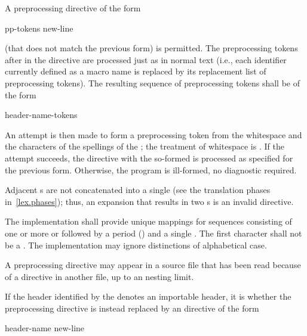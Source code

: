 \pnum
A preprocessing directive of the form
\begin{ncsimplebnf}
 pp-tokens new-line
\end{ncsimplebnf}
(that does not match the previous form) is permitted.
The preprocessing tokens after
in the directive are processed just as in normal text
(i.e., each identifier currently defined as a macro name is replaced by its
replacement list of preprocessing tokens).
The resulting sequence of preprocessing tokens shall be of the form
\begin{ncsimplebnf}
header-name-tokens
\end{ncsimplebnf}
An attempt is then made to form a 
preprocessing token from the whitespace and the characters
of the spellings of the ;
the treatment of whitespace
is .
If the attempt succeeds, the directive with the so-formed 
is processed as specified for the previous form.
Otherwise, the program is
ill-formed, no diagnostic required.
\begin{note}
Adjacent s are not concatenated into
a single 
(see the translation phases in~\ref{lex.phases});
thus, an expansion that results in two s is an
invalid directive.
\end{note}

\pnum
The implementation shall provide unique mappings for
sequences consisting of one or more
 or 
followed by a period
()
and a single
.
The first character shall not be a .
The implementation may ignore distinctions of alphabetical case.

\pnum
A
preprocessing directive may appear
in a source file that has been read because of a
directive in another file,
up to an  nesting limit.

\pnum
If the header identified by the 
denotes an importable header,
it is
whether the  preprocessing directive
is instead replaced by an  directive of the form
\begin{ncbnf}
 header-name \terminal{;} new-line
\end{ncbnf}

